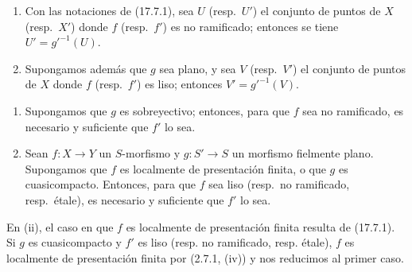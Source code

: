 \begin{corollary}[17.7.2]
\label{IV.17.7.2}
\begin{enumerate}
  \item[\textup{(i)}] Con las notaciones de \textup{(17.7.1)}, sea $U$ \textup{(resp.}\ $U'$\textup{)} el conjunto de puntos de $X$ \textup{(resp.}\ $X'$\textup{)} donde $f$ \textup{(resp.}\ $f'$\textup{)} es no ramificado; entonces se tiene $U'=g'^{-1}(U)$.
  \item[\textup{(ii)}] Supongamos además que $g$ sea plano, y sea $V$ \textup{(resp.}\ $V'$\textup{)} el conjunto de puntos de $X$ donde $f$ \textup{(resp.}\ $f'$\textup{)} es liso; entonces $V'=g'^{-1}(V)$.
\end{enumerate}
\end{corollary}

\begin{corollary}[17.7.3]
\label{IV.17.7.3}
\begin{enumerate}
  \item[\textup{(i)}] Supongamos que $g$ es sobreyectivo; entonces, para que $f$ sea no ramificado, es necesario y suficiente que $f'$ lo sea.
  \item[\textup{(ii)}] Sean $f:X\to Y$ un $S$-morfismo y $g:S'\to S$ un morfismo fielmente plano. Supongamos que $f$ es localmente de presentación finita, \textup{o} que $g$ es cuasicompacto. Entonces, para que $f$ sea liso \textup{(resp.}\ no ramificado, \textup{resp.}\ étale\textup{)}, es necesario y suficiente que $f'$ lo sea.
\end{enumerate}
\end{corollary}

En (ii), el caso en que $f$ es localmente de presentación finita resulta de (17.7.1). Si $g$ es cuasicompacto y $f'$ es liso (resp. no ramificado, resp. étale), $f$ es localmente de presentación finita por (2.7.1, (iv)) y nos reducimos al primer caso.

